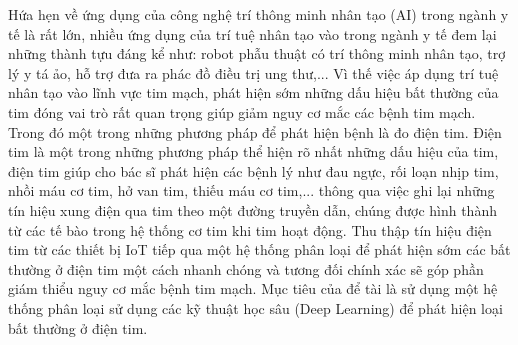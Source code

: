 Hứa hẹn về ứng dụng của công nghệ trí thông minh nhân tạo (AI) trong ngành y tế là rất lớn, nhiều ứng dụng của trí tuệ nhân tạo vào trong ngành y tế đem lại những thành tựu đáng kể như: robot phẫu thuật có trí thông minh nhân tạo, trợ lý y tá ảo, hỗ trợ đưa ra phác đồ điều trị ung thư,... Vì thế việc áp dụng trí tuệ nhân tạo vào lĩnh vực tim mạch, phát hiện sớm những dấu hiệu bất thường của tim đóng vai trò rất quan trọng giúp giảm nguy cơ mắc các bệnh tim mạch. Trong đó một trong những phương pháp để phát hiện bệnh là đo điện tim. Điện tim là một trong những phương pháp thể hiện rõ nhất những dấu hiệu của tim, điện tim giúp cho bác sĩ phát hiện các bệnh lý như đau ngực, rối loạn nhịp tim, nhồi máu cơ tim, hở van tim, thiếu máu cơ tim,... thông qua việc ghi lại những tín hiệu xung điện qua tim theo một đường truyền dẫn, chúng được hình thành từ các tế bào trong hệ thống cơ tim khi tim hoạt động. Thu thập tín hiệu điện tim từ các thiết bị IoT tiếp qua một hệ thống phân loại để phát hiện sớm các bất thường ở điện tim một cách nhanh chóng và tương đối chính xác sẽ góp phần giám thiểu nguy cơ mắc bệnh tim mạch. Mục tiêu của để tài là sử dụng một hệ thống phân loại sử dụng các kỹ thuật học sâu (Deep Learning) để phát hiện loại bất thường ở điện tim.

